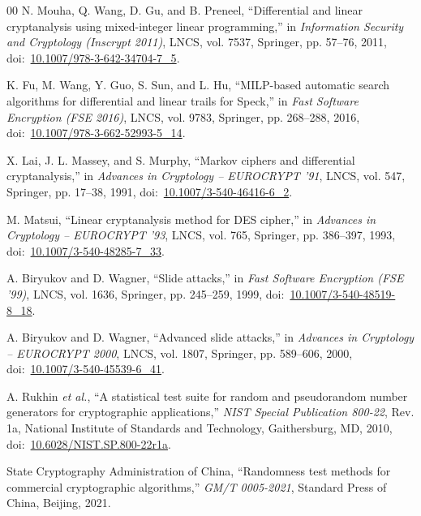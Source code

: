 \documentclass[10pt,twocolumn]{article}
\begin{document}
\begin{thebibliography}{00}
N. Mouha, Q. Wang, D. Gu, and B. Preneel, ``Differential and linear cryptanalysis using mixed-integer linear programming,'' in \textit{Information Security and Cryptology (Inscrypt 2011)}, LNCS, vol. 7537, Springer, pp. 57--76, 2011, doi:~\href{https://doi.org/10.1007/978-3-642-34704-7_5}{10.1007/978-3-642-34704-7\_5}.

K. Fu, M. Wang, Y. Guo, S. Sun, and L. Hu, ``MILP-based automatic search algorithms for differential and linear trails for Speck,'' in \textit{Fast Software Encryption (FSE 2016)}, LNCS, vol. 9783, Springer, pp. 268--288, 2016, doi:~\href{https://doi.org/10.1007/978-3-662-52993-5_14}{10.1007/978-3-662-52993-5\_14}.

X. Lai, J. L. Massey, and S. Murphy, ``Markov ciphers and differential cryptanalysis,'' in \textit{Advances in Cryptology -- EUROCRYPT '91}, LNCS, vol. 547, Springer, pp. 17--38, 1991, doi:~\href{https://doi.org/10.1007/3-540-46416-6_2}{10.1007/3-540-46416-6\_2}.

M. Matsui, ``Linear cryptanalysis method for DES cipher,'' in \textit{Advances in Cryptology -- EUROCRYPT '93}, LNCS, vol. 765, Springer, pp. 386--397, 1993, doi:~\href{https://doi.org/10.1007/3-540-48285-7_33}{10.1007/3-540-48285-7\_33}.

A. Biryukov and D. Wagner, ``Slide attacks,'' in \textit{Fast Software Encryption (FSE '99)}, LNCS, vol. 1636, Springer, pp. 245--259, 1999, doi:~\href{https://doi.org/10.1007/3-540-48519-8_18}{10.1007/3-540-48519-8\_18}.

A. Biryukov and D. Wagner, ``Advanced slide attacks,'' in \textit{Advances in Cryptology -- EUROCRYPT 2000}, LNCS, vol. 1807, Springer, pp. 589--606, 2000, doi:~\href{https://doi.org/10.1007/3-540-45539-6_41}{10.1007/3-540-45539-6\_41}.

A. Rukhin \textit{et al.}, ``A statistical test suite for random and pseudorandom number generators for cryptographic applications,'' \textit{NIST Special Publication 800-22}, Rev. 1a, National Institute of Standards and Technology, Gaithersburg, MD, 2010, doi:~\href{https://doi.org/10.6028/NIST.SP.800-22r1a}{10.6028/NIST.SP.800-22r1a}.

State Cryptography Administration of China, ``Randomness test methods for commercial cryptographic algorithms,'' \textit{GM/T 0005-2021}, Standard Press of China, Beijing, 2021.


\end{thebibliography}
\end{document}
